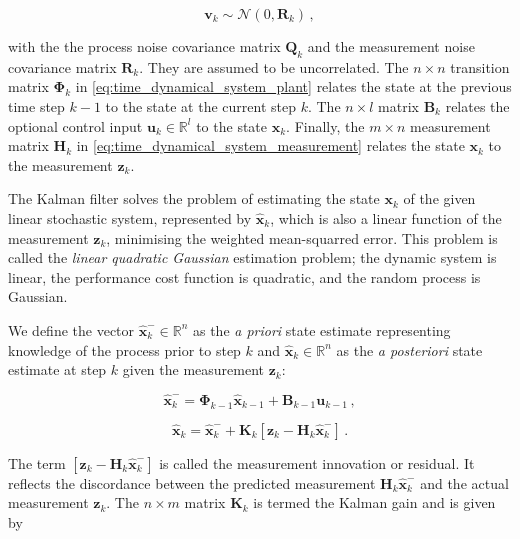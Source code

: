 \begin{equation}\label{eq:measurement_noise}
  \mathbf{v}_{k} \sim \mathcal{N}(0,\mathbf{R}_k)\,,
\end{equation}
 
\noindent
with the the process noise covariance matrix $\mathbf{Q}_k$ and the measurement noise covariance matrix $\mathbf{R}_k$. They are assumed to be uncorrelated. The $n\times n$ transition matrix $\bm{\Phi}_{k}$ in \ref{eq:time_dynamical_system_plant} relates the state at the previous time step $k-1$ to the state at the current step $k$. The $n\times l$ matrix $\mathbf{B}_{k}$ relates the optional control input $\mathbf{u}_k \in \mathbb{R}^l$ to the state $\mathbf{x}_k$. Finally, the $m\times n$ measurement matrix $\mathbf{H}_{k}$ in \ref{eq:time_dynamical_system_measurement} relates the state $\mathbf{x}_k$ to the measurement $\mathbf{z}_k$.

The Kalman filter solves the problem of estimating the state $\mathbf{x}_k$ of the given linear stochastic system, represented by $\hat{\mathbf{x}}_k$, which is also a linear function of the measurement $\mathbf{z}_k$, minimising the weighted mean-squarred error. This problem is called the \emph{linear quadratic Gaussian} estimation problem; the dynamic system is linear, the performance cost function is quadratic, and the random process is Gaussian.

We define the vector $\hat{\mathbf{x}}^-_k \in \mathbb{R}^n$ as the \emph{a priori} state estimate representing knowledge of the process prior to step $k$ and $\hat{\mathbf{x}}_k \in \mathbb{R}^n$ as the \emph{a posteriori} state estimate at step $k$ given the measurement $\mathbf{z}_k$:

\begin{equation}\label{eq:apriori_estimate}
  \hat{\mathbf{x}}^-_k = \bm{\Phi}_{k-1}\hat{\mathbf{x}}_{k-1}+\mathbf{B}_{k-1}\mathbf{u}_{k-1}\,,
\end{equation}

\begin{equation}\label{eq:aposteriori_estimate}
  \hat{\mathbf{x}}_k = \hat{\mathbf{x}}^-_k + \mathbf{K}_{k}[\mathbf{z}_k-\mathbf{H}_{k}\hat{\mathbf{x}}^-_k]\,.
\end{equation}

\noindent
The term $[\mathbf{z}_k-\mathbf{H}_{k}\hat{\mathbf{x}}^-_k]$ is called the measurement innovation or residual. It reflects the discordance between the predicted measurement $\mathbf{H}_{k}\hat{\mathbf{x}}^-_k$ and the actual measurement $\mathbf{z}_k$. The $n\times m$ matrix $\mathbf{K}_{k}$ is termed the Kalman gain and is given by

